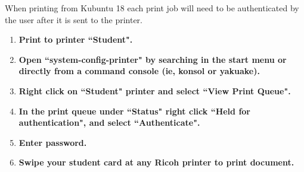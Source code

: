 \documentclass{../../../assets/LabArx-Dev} 	%
\begin{document}


\maketitle
\fancyfoot{}

When printing from Kubuntu 18 each print job will need to be authenticated by the user after it is sent to the printer.

\begin{enumerate}

\item {\bf Print to printer ``Student".}
\item {\bf Open ``system-config-printer" by searching in the start menu or directly from a command console (ie, konsol or yakuake).}
\item {\bf Right click on ``Student" printer and select ``View Print Queue".}
\item {\bf In the print queue under ``Status" right click ``Held for authentication", and select ``Authenticate".}
\item {\bf Enter password.}
\item {\bf Swipe your student card at any Ricoh printer to print document.}
\end{enumerate}
\end{document}
